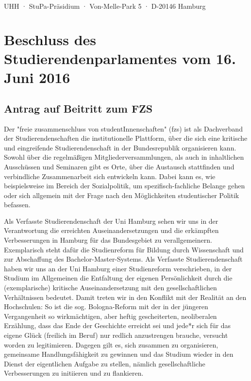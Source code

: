 \documentclass[ngerman,headheight=70pt]{scrartcl}
\begin{document}
    UHH · StuPa-Präsidium · Von-Melle-Park 5 · D-20146 Hamburg

    \section*{Beschluss des Studierendenparlamentes vom 16. Juni 2016}
    \subsection*{Antrag auf Beitritt zum FZS}

    Der "freie zusammenschluss von studentInnenschaften" (fzs) ist als
    Dachverband der Studierendenschaften die institutionelle Plattform, über die
    sich eine kritische und eingreifende Studierendenschaft in der Bundesrepublik
    organisieren kann. Sowohl über die regelmäßigen Mitgliederversammlungen, als
    auch in inhaltlichen Ausschüssen und Seminaren gibt es Orte, über die Austausch
    stattfinden und verbindliche Zusammenarbeit sich entwickeln kann. Dabei kann
    es, wie beispielsweise im Bereich der Sozialpolitik, um spezifisch-fachliche
    Belange gehen oder sich allgemein mit der Frage nach den Möglichkeiten
    studentischer Politik befassen.

    Als Verfasste Studierendenschaft der Uni Hamburg sehen wir uns in der
    Verantwortung die erreichten Auseinandersetzungen und die erkämpften
    Verbesserungen in Hamburg für das Bundesgebiet zu verallgemeinern. Exemplarisch
    steht dafür die Studienreform für Bildung durch Wissenschaft und zur
    Abschaffung des Bachelor-Master-Systems. Als Verfasste Studierendenschaft
    haben wir uns an der Uni Hamburg einer Studienreform verschrieben, in der
    Studium im Allgemeinen die Entfaltung der eigenen Persönlichkeit durch die
    (exemplarische) kritische Auseinandersetzung mit den gesellschaftlichen
    Verhältnissen bedeutet. Damit treten wir in den Konflikt mit der Realität an
    den Hochschulen: So ist die sog. Bologna-Reform mit der in der jüngeren
    Vergangenheit so wirkmächtigen, aber heftig gescheiterten, neoliberalen
    Erzählung, dass das Ende der Geschichte erreicht sei und jede*r sich für das
    eigene Glück (freilich im Beruf) nur redlich anzustrengen brauche, versucht
    worden zu legitimieren. Dagegen gilt es, sich zusammen zu organisieren,
    gemeinsame Handlungsfähigkeit zu gewinnen und das Studium wieder in den Dienst
    der eigentlichen Aufgabe zu stellen, nämlich gesellschaftliche Verbesserungen
    zu initiieren und zu flankieren.
\end{document}

